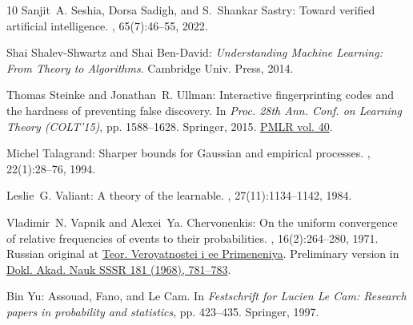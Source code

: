 \begin{thebibliography}{10}
{\sc Sanjit~A. Seshia, Dorsa Sadigh, and S.~Shankar Sastry}: Toward verified
  artificial intelligence.
, 65(7):46--55, 2022.
\newblock [\epfmtdoi{10.1145/3503914}]

{\sc Shai Shalev{-}Shwartz and Shai Ben{-}David}: {\em Understanding Machine
  Learning: From Theory to Algorithms}.
\newblock Cambridge Univ. Press, 2014.

{\sc Thomas Steinke and Jonathan~R. Ullman}: Interactive fingerprinting codes
  and the hardness of preventing false discovery.
\newblock In {\em Proc. 28th Ann. Conf. on Learning Theory (COLT'15)}, pp.
  1588--1628. Springer, 2015.
\newblock \href{http://proceedings.mlr.press/v40/Steinke15.html}{PMLR vol. 40}.

{\sc Michel Talagrand}: Sharper bounds for {G}aussian and empirical processes.
, 22(1):28--76, 1994.

{\sc Leslie~G. Valiant}: A theory of the learnable.
, 27(11):1134--1142, 1984.
\newblock [\epfmtdoi{10.1145/1968.1972}]

{\sc Vladimir~N. Vapnik and Alexei~Ya. Chervonenkis}: On the uniform
  convergence of relative frequencies of events to their probabilities.
, 16(2):264--280, 1971.
\newblock Russian original at
  \href{https://www.mathnet.ru/links/3704b04dde93ca91eab24902517ad339/tvp2146.pdf}{Teor.
  Veroyatnostei i ee Primeneniya}. Preliminary version in
  \href{https://www.ams.org/mathscinet-getitem?mr=0231431}{Dokl. Akad. Nauk
  SSSR 181 (1968), 781–783}.
\newblock [\epfmtdoi{10.1137/1116025}]

{\sc Bin Yu}: {A}ssouad, {F}ano, and {L}e {C}am.
\newblock In {\em {F}estschrift for {L}ucien {L}e {C}am: {R}esearch papers in
  probability and statistics}, pp. 423--435. Springer, 1997.
\newblock [\epfmtdoi{10.1007/978-1-4612-1880-7\_29}]

\end{thebibliography}